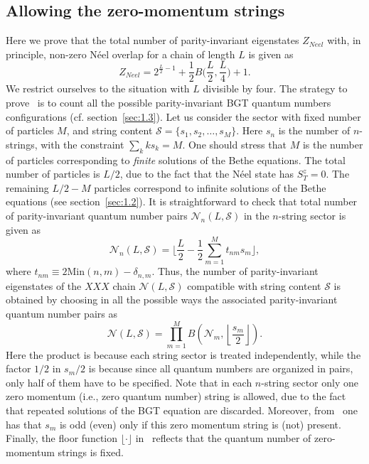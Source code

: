\documentclass[11pt]{iopart}
\begin{document}
\subsection{Allowing the zero-momentum strings}
\label{app-1.1}


Here we prove that the total number of parity-invariant eigenstates $Z_{Neel}$ 
with, in principle, non-zero N\'eel overlap for a chain of length $L$ is given 
as 
%
\begin{equation}
\label{N-count}
Z_{Neel}=2^{\frac{L}{2}-1}+\frac{1}{2}B\Big(\frac{L}{2},\frac{L}{4}\Big)+1. 
\end{equation}
%
We restrict ourselves to the situation with $L$ divisible by four. The strategy to 
prove~ is to count all the possible parity-invariant BGT quantum numbers 
configurations (cf. section~\ref{sec:1.3}). Let us consider the sector with fixed number 
of particles $M$, and string content ${\mathcal S}=\{s_1,s_2,\dots,s_{M}\}$. Here $s_n$ is 
the number of $n$-strings, with the constraint $\sum_k ks_k=M$. One should stress that 
$M$ is the number of particles corresponding to {\it finite} solutions of the Bethe 
equations. The total number of particles is $L/2$, due to the fact that the N\'eel 
state has $S_T^z=0$. The remaining $L/2-M$ particles correspond to infinite solutions 
of the Bethe equations (see section~\ref{sec:1.2}). It is straightforward to check that 
total number of parity-invariant quantum number pairs ${\mathcal N}_n(L,{\mathcal S})$ 
in the $n$-string sector is given as 
%
\begin{equation}
\label{NnLS}
{\mathcal N}_n(L,{\mathcal S})=\Big\lfloor\frac{L}{2}-\frac{1}{2}
\sum_{m=1}^{M}t_{nm}s_m\Big\rfloor,
\end{equation}
%
where $t_{nm}\equiv 2\textrm{Min}(n,m)-\delta_{n,m}$. Thus, the number of parity-invariant 
eigenstates of the $XXX$ chain ${\mathcal N}(L,{\mathcal S})$ compatible with string content 
${\mathcal S}$ is obtained by choosing in all the possible ways the associated parity-invariant 
quantum number pairs as     
%
\begin{equation}
\label{NLS}
{\mathcal N}(L,{\mathcal S})=\prod_{m=1}^{M} B\left({\mathcal N}_m,\left\lfloor
\frac{s_m}{2}\right\rfloor\right).
\end{equation}
%
Here the product is because each string sector is treated independently, while the 
factor $1/2$ in $s_m/2$ is because since all quantum numbers are organized in pairs, 
only half of them have to be specified. Note that in each $n$-string sector only one 
zero momentum (i.e., zero quantum number) string is allowed, due to the fact that 
repeated solutions of the BGT equation are discarded. Moreover, from~ one has 
that $s_m$ is odd (even) only if this zero momentum string is (not) present. Finally, 
the floor function $\lfloor\cdot\rfloor$ in~ reflects that the quantum number 
of zero-momentum strings is fixed. 
\end{document}
